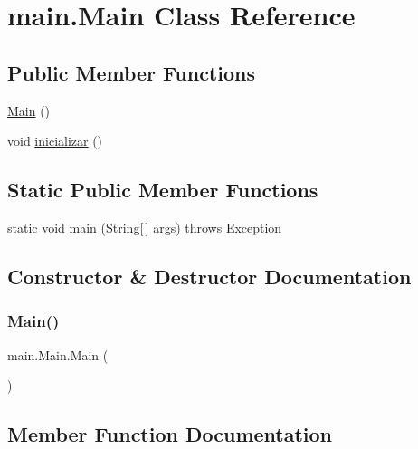 \hypertarget{classmain_1_1_main}{}\section{main.\+Main Class Reference}
\label{classmain_1_1_main}
\subsection*{Public Member Functions}
\begin{DoxyCompactItemize}
\item 
\mbox{\hyperlink{classmain_1_1_main_a3bd36c15a333d7b594eb71f68a938492}{Main}} ()
\item 
void \mbox{\hyperlink{classmain_1_1_main_ad6d72b7263cb2cdb870dac7ae778adef}{inicializar}} ()
\end{DoxyCompactItemize}
\subsection*{Static Public Member Functions}
\begin{DoxyCompactItemize}
\item 
static void \mbox{\hyperlink{classmain_1_1_main_a896f71a651b705304693dbfe0cf9ca63}{main}} (String\mbox{[}$\,$\mbox{]} args)  throws Exception 
\end{DoxyCompactItemize}


\subsection{Constructor \& Destructor Documentation}
\mbox{\label{classmain_1_1_main_a3bd36c15a333d7b594eb71f68a938492}} 
\subsubsection{\texorpdfstring{Main()}{Main()}}
{\footnotesize\ttfamily main.\+Main.\+Main (\begin{DoxyParamCaption}{ }\end{DoxyParamCaption})}



\subsection{Member Function Documentation}
\mbox{\label{classmain_1_1_main_ad6d72b7263cb2cdb870dac7ae778adef}} 
